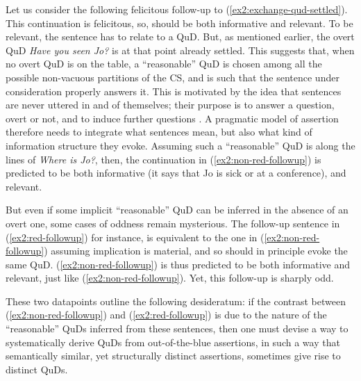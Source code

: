 Let us consider the following felicitous follow-up to (\ref{ex2:exchange-qud-settled}). This continuation is felicitous, so, should be both informative and relevant. To be relevant, the sentence has to relate to a QuD. But, as mentioned earlier, the overt QuD \textit{Have you seen Jo?} is at that point already settled. This suggests that, when no overt QuD is on the table, a ``reasonable'' QuD is chosen among all the possible non-vacuous partitions of the CS, and is such that the sentence under consideration properly answers it. This is motivated by the idea that sentences are never uttered in and of themselves; their purpose is to answer a question, overt or not, and to induce further questions \cite{Roberts1996}. A pragmatic model of assertion therefore needs to integrate what sentences mean, but also what kind of information structure they evoke. Assuming such a ``reasonable'' QuD is along the lines of \textit{Where is Jo?}, then, the continuation in (\ref{ex2:non-red-followup}) is predicted to be both informative (it says that Jo is sick or at a conference), and relevant.

\begin{exe}
	\label{ex2:non-red-followup}
\end{exe}

But even if some implicit ``reasonable'' QuD can be inferred in the absence of an overt one, some cases of oddness remain mysterious. The follow-up sentence in (\ref{ex2:red-followup}) for instance, is equivalent to the one in (\ref{ex2:non-red-followup}) assuming implication is material, and so should in principle evoke the same QuD. (\ref{ex2:non-red-followup}) is thus predicted to be both informative and relevant, just like (\ref{ex2:non-red-followup}). Yet, this follow-up is sharply odd.

\begin{exe}
	\label{ex2:red-followup}
\end{exe}

These two datapoints outline the following desideratum: if the contrast between (\ref{ex2:non-red-followup}) and (\ref{ex2:red-followup}) is due to the nature of the ``reasonable'' QuDs inferred from these sentences, then one must devise a way to systematically derive QuDs from out-of-the-blue assertions, in such a way that semantically similar, yet structurally distinct assertions, sometimes give rise to distinct QuDs.



